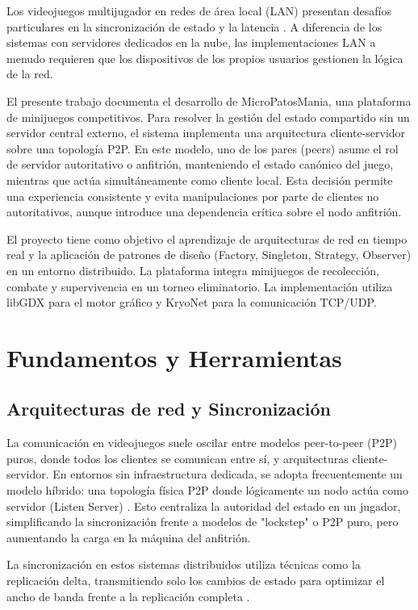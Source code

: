 \documentclass[conference]{IEEEtran}
\begin{document}
Los videojuegos multijugador en redes de área local (LAN) presentan desafíos particulares en la sincronización de estado y la latencia \cite{gregory2018game}. A diferencia de los sistemas con servidores dedicados en la nube, las implementaciones LAN a menudo requieren que los dispositivos de los propios usuarios gestionen la lógica de la red.

El presente trabajo documenta el desarrollo de MicroPatosMania, una plataforma de minijuegos competitivos. Para resolver la gestión del estado compartido sin un servidor central externo, el sistema implementa una arquitectura cliente-servidor sobre una topología P2P. En este modelo, uno de los pares (peers) asume el rol de servidor autoritativo o anfitrión, manteniendo el estado canónico del juego, mientras que actúa simultáneamente como cliente local. Esta decisión permite una experiencia consistente y evita manipulaciones por parte de clientes no autoritativos, aunque introduce una dependencia crítica sobre el nodo anfitrión.

El proyecto tiene como objetivo el aprendizaje de arquitecturas de red en tiempo real y la aplicación de patrones de diseño (Factory, Singleton, Strategy, Observer) en un entorno distribuido. La plataforma integra minijuegos de recolección, combate y supervivencia en un torneo eliminatorio. La implementación utiliza libGDX \cite{libgdx} para el motor gráfico y KryoNet \cite{kryonet} para la comunicación TCP/UDP.

\section{Fundamentos y Herramientas}

\subsection{Arquitecturas de red y Sincronización}
La comunicación en videojuegos suele oscilar entre modelos peer-to-peer (P2P) puros, donde todos los clientes se comunican entre sí, y arquitecturas cliente-servidor. En entornos sin infraestructura dedicada, se adopta frecuentemente un modelo híbrido: una topología física P2P donde lógicamente un nodo actúa como servidor (Listen Server) \cite{fiedler2010networking}. Esto centraliza la autoridad del estado en un jugador, simplificando la sincronización frente a modelos de "lockstep" o P2P puro, pero aumentando la carga en la máquina del anfitrión.

La sincronización en estos sistemas distribuidos utiliza técnicas como la replicación delta, transmitiendo solo los cambios de estado para optimizar el ancho de banda frente a la replicación completa \cite{manninen2004rich}.
\end{document}
